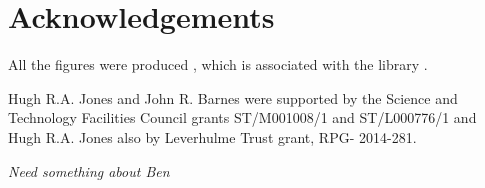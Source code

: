 \section{Acknowledgements}

All the figures were produced , which is
associated with the {\scipy} library \citep{jones01}.


Hugh R.A. Jones and John R. Barnes were supported by the Science and Technology Facilities Council grants ST/M001008/1
and ST/L000776/1 and Hugh R.A. Jones also by Leverhulme Trust grant, RPG-
2014-281.

\textit{Need something about Ben}
